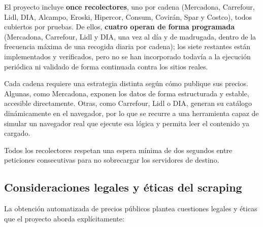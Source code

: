 El proyecto incluye \textbf{once recolectores}, uno por cadena (Mercadona, Carrefour, Lidl, DIA,
Alcampo, Eroski, Hipercor, Consum, Covir\'an, Spar y Costco), todos cubiertos por pruebas. De
ellos, \textbf{cuatro operan de forma programada} (Mercadona, Carrefour, Lidl y DIA, una vez al
d\'ia y de madrugada, dentro de la frecuencia m\'axima de una recogida diaria por cadena); los
siete restantes est\'an
implementados y verificados, pero no se han incorporado todav\'ia a la ejecuci\'on peri\'odica ni
validado de forma continuada contra los sitios reales.

Cada cadena requiere una estrategia distinta seg\'un c\'omo publique sus precios. Algunas, como
Mercadona, exponen los datos de forma estructurada y estable, accesible directamente. Otras, como
Carrefour, Lidl o DIA, generan su cat\'alogo din\'amicamente en el navegador, por lo que se recurre
a una herramienta capaz de simular un navegador real \cite{playwright_docs} que ejecute esa
l\'ogica y permita leer el contenido ya cargado.

Todos los recolectores respetan una espera m\'inima de dos segundos entre peticiones consecutivas
para no sobrecargar los servidores de destino.

\subsection{Consideraciones legales y \'eticas del scraping}\label{subsec:scraping-legal}

La obtenci\'on automatizada de precios p\'ublicos plantea cuestiones legales y \'eticas que el
proyecto aborda expl\'icitamente:

